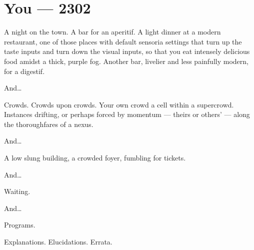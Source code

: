 \chapter*{You — 2302}

\null
\vfill
A night on the town. A bar for an aperitif. A light dinner at a modern restaurant, one of those places with default sensoria settings that turn up the taste inputs and turn down the visual inputs, so that you eat intensely delicious food amidst a thick, purple fog. Another bar, livelier and less painfully modern, for a digestif.

\vfill

\newpage

\null
\vfill

And\ldots{}

\null
\vfill

\newpage

\null
\vfill

Crowds. Crowds upon crowds. Your own crowd a cell within a supercrowd. Instances drifting, or perhaps forced by momentum --- theirs or others' --- along the thoroughfares of a nexus.

\null
\vfill

\newpage

\null
\vfill

And\ldots{}

\null
\vfill

\newpage

\null
\vfill

A low slung building, a crowded foyer, fumbling for tickets.

\null
\vfill

\newpage

\null
\vfill

And\ldots{}

\null
\vfill

\newpage

\null
\vfill

Waiting.

\null
\vfill

\newpage

\null
\vfill

And\ldots{}

\null
\vfill

\newpage

\null
\vfill

Programs.

Explanations. Elucidations. Errata.

